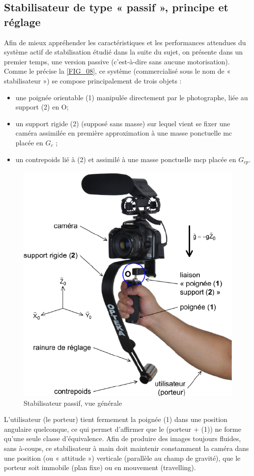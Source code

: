 \documentclass[10pt,fleqn]{article} %
\begin{document}
\subsection{Stabilisateur de type « passif », principe et réglage}
 

Afin de mieux appréhender les caractéristiques et les performances attendues du système actif de stabilisation étudié dans la suite du sujet, on présente dans un premier temps, une version passive (c’est-à-dire sans aucune motorisation). Comme le précise la \autoref{FIG_08}, ce système (commercialisé sous le nom de « stabilisateur ») se compose principalement de trois objets :
\begin{itemize}
\item une poignée orientable (1) manipulée directement par le photographe, liée au support (2) en O;
\item un support rigide (2) (supposé sans masse) sur lequel vient se fixer une caméra assimilée en première approximation à une masse ponctuelle mc placée en $G_c$ ;
\item un contrepoids lié à (2) et assimilé à une masse ponctuelle mcp placée en $G_{cp}$.
\end{itemize}

\begin{figure}[H]
\centering
\includegraphics[width=.5\linewidth]{FiG_08}
\caption{Stabilisateur passif, vue générale \label{FIG_08}}
\end{figure}

L’utilisateur (le porteur) tient fermement la poignée (1) dans une position angulaire quelconque, ce qui permet d’affirmer que le (porteur + (1)) ne forme qu’une seule classe d’équivalence. 
Afin de produire des images toujours fluides, sans à-coups, ce stabilisateur à main doit maintenir constamment la caméra dans une position (ou « attitude ») verticale (parallèle au champ de gravité), que le porteur soit immobile (plan fixe) ou en mouvement (travelling).
\end{document}
